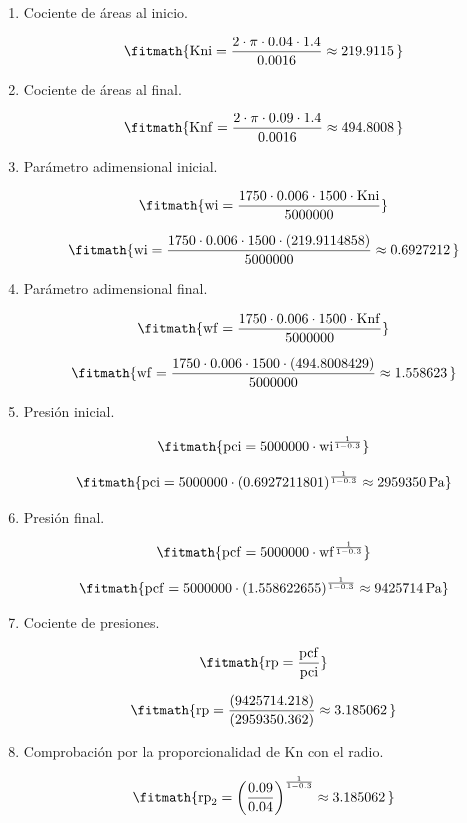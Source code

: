 \begin{enumerate}

\item Cociente de áreas al inicio.

\[\fitmath{\mathrm{Kni}=\frac{2\cdot \pi\cdot 0.04\cdot 1.4}{0.0016}\approx 219.9115\,}\]

\item Cociente de áreas al final.

\[\fitmath{\mathrm{Knf}=\frac{2\cdot \pi\cdot 0.09\cdot 1.4}{0.0016}\approx 494.8008\,}\]

\item Parámetro adimensional inicial.

\[\fitmath{\mathrm{wi}=\frac{1750\cdot 0.006\cdot 1500\cdot \mathrm{Kni}}{5000000}}\]

\[\fitmath{\mathrm{wi}=\frac{1750\cdot 0.006\cdot 1500\cdot (219.9114858)}{5000000}\approx 0.6927212\,}\]

\item Parámetro adimensional final.

\[\fitmath{\mathrm{wf}=\frac{1750\cdot 0.006\cdot 1500\cdot \mathrm{Knf}}{5000000}}\]

\[\fitmath{\mathrm{wf}=\frac{1750\cdot 0.006\cdot 1500\cdot (494.8008429)}{5000000}\approx 1.558623\,}\]

\item Presión inicial.

\[\fitmath{\mathrm{pci}=5000000\cdot {\mathrm{wi}}^{\frac{1}{1-0.3}}}\]

\[\fitmath{\mathrm{pci}=5000000\cdot {(0.6927211801)}^{\frac{1}{1-0.3}}\approx 2959350\,\mathrm{Pa}}\]

\item Presión final.

\[\fitmath{\mathrm{pcf}=5000000\cdot {\mathrm{wf}}^{\frac{1}{1-0.3}}}\]

\[\fitmath{\mathrm{pcf}=5000000\cdot {(1.558622655)}^{\frac{1}{1-0.3}}\approx 9425714\,\mathrm{Pa}}\]

\item Cociente de presiones.

\[\fitmath{\mathrm{rp}=\frac{\mathrm{pcf}}{\mathrm{pci}}}\]

\[\fitmath{\mathrm{rp}=\frac{(9425714.218)}{(2959350.362)}\approx 3.185062\,}\]

\item Comprobación por la proporcionalidad de Kn con el radio.

\[\fitmath{\mathrm{rp}_{2}={\left(\frac{0.09}{0.04}\right)}^{\frac{1}{1-0.3}}\approx 3.185062\,}\]

\end{enumerate}
